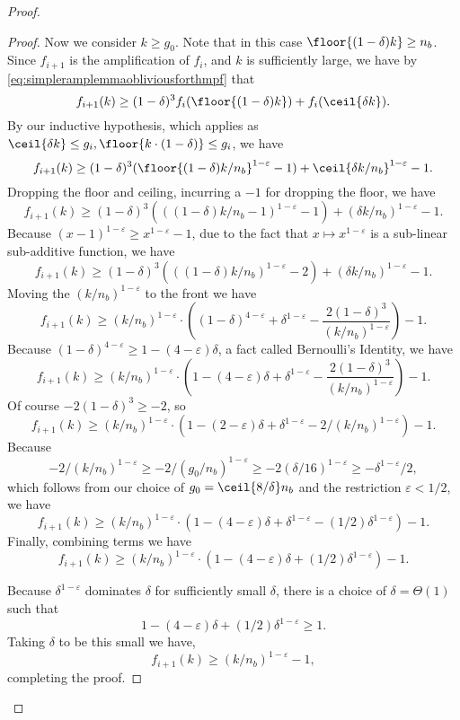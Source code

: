\begin{proof}
\begin{proof}
  Now we consider $k \ge g_0$. Note that in this case $\floor{(1-\delta)k} \ge n_b$.
  Since $f_{i+1}$ is the amplification of $f_i$, and $k$ is sufficiently large, we have by \eqref{eq:simpleramplemmaobliviousforthmpf} that
  $$f_{i+1}(k) \ge (1-\delta)^3 f_i(\floor{(1-\delta)k}) + f_i(\ceil{\delta k}).$$
  By our inductive hypothesis, which applies as $\ceil{\delta k}\le g_i, \floor{k\cdot (1-\delta)} \le g_i$, we have
  $$f_{i+1}(k) \ge (1-\delta)^3 (\floor{(1-\delta)k/n_b}^{1-\varepsilon}-1) + \ceil{\delta k/n_b}^{1-\varepsilon} - 1. $$
  Dropping the floor and ceiling, incurring a $-1$ for dropping the floor, we have
  $$f_{i+1}(k) \ge (1-\delta)^3 (((1-\delta)k/n_b-1)^{1-\varepsilon}-1) + (\delta k/n_b)^{1-\varepsilon} - 1.$$
  Because $(x-1)^{1-\varepsilon} \ge x^{1-\varepsilon} -1$, due to the
  fact that $x\mapsto x^{1-\varepsilon}$ is a sub-linear
  sub-additive function, we have 
  $$f_{i+1}(k) \ge (1-\delta)^3 (((1-\delta)k/n_b)^{1-\varepsilon}-2) + (\delta k/n_b)^{1-\varepsilon}-1.$$
  Moving the $(k/n_b)^{1-\varepsilon}$ to the front we have
  $$ f_{i+1}(k) \ge (k/n_b)^{1-\varepsilon} \cdot\left((1-\delta)^{4-\varepsilon} + \delta^{1-\varepsilon} - \frac{2(1-\delta)^3}{(k/n_b)^{1-\varepsilon}} \right) -1.$$
  Because $(1-\delta)^{4-\varepsilon} \ge 1-(4-\varepsilon)\delta$, a fact called Bernoulli's Identity, we have
  $$f_{i+1}(k) \ge (k/n_b)^{1-\varepsilon} \cdot\left(1-(4-\varepsilon)\delta + \delta^{1-\varepsilon} - \frac{2(1-\delta)^3}{(k/n_b)^{1-\varepsilon}} \right)-1.$$
  Of course $-2(1-\delta)^3 \ge -2$, so 
  $$f_{i+1}(k) \ge (k/n_b)^{1-\varepsilon} \cdot\left(1-(2-\varepsilon)\delta + \delta^{1-\varepsilon} - 2/(k/n_b)^{1-\varepsilon} \right) -1.$$
  Because $$-2/(k/n_b)^{1-\varepsilon} \ge -2/(g_0/n_b)^{1-\varepsilon} \ge
  -2(\delta/16)^{1-\varepsilon} \ge -\delta^{1-\varepsilon}/2,$$
  which follows from our choice of $g_0 = \ceil{8/\delta} n_b$ and the restriction
  $\varepsilon<1/2$, we have 
  $$f_{i+1}(k) \ge (k/n_b)^{1-\varepsilon} \cdot\left(1-(4-\varepsilon)\delta + \delta^{1-\varepsilon} - (1/2)\delta^{1-\varepsilon} \right)-1.$$
  Finally, combining terms we have
  $$f_{i+1}(k) \ge  (k/n_b)^{1-\varepsilon} \cdot\left(1-(4-\varepsilon)\delta + (1/2)\delta^{1-\varepsilon}\right)-1. $$

  Because $\delta^{1-\varepsilon}$ dominates $\delta$ for
  sufficiently small $\delta$, there is a choice of
  $\delta=\Theta(1)$ such that 
  $$1-(4-\varepsilon)\delta + (1/2)\delta^{1-\varepsilon} \ge 1.$$ 
  Taking $\delta$ to be this small we have,
  $$f_{i+1}(k) \ge (k/n_b)^{1-\varepsilon}-1,$$
  completing the proof. 
  \end{proof}


\end{proof}
